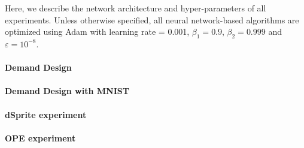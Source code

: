 Here, we describe the network architecture and hyper-parameters of all experiments. Unless otherwise specified, all neural network-based algorithms are optimized using Adam with learning rate = 0.001, $\beta_1=0.9$, $\beta_2=0.999$ and $\varepsilon = 10^{-8}$.


\paragraph{Demand Design}  


\paragraph{Demand Design with MNIST}  



\paragraph{dSprite experiment}  


\paragraph{OPE experiment}

